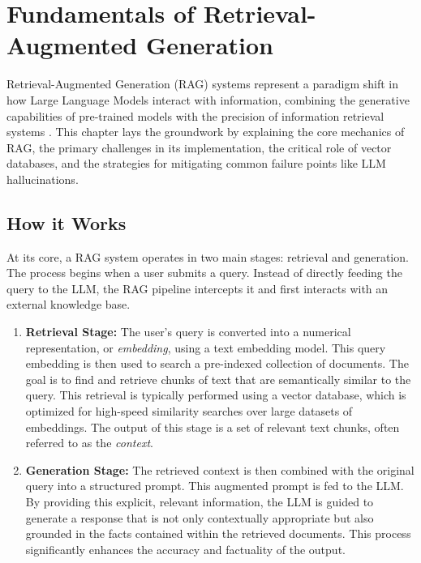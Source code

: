 \chapter{Fundamentals of Retrieval-Augmented Generation}
\label{chap:fundamentals_rag}

Retrieval-Augmented Generation (RAG) systems represent a paradigm shift in how Large Language Models interact with information, combining the generative capabilities of pre-trained models with the precision of information retrieval systems \autocite{rag_survey_2024_ralm}. This chapter lays the groundwork by explaining the core mechanics of RAG, the primary challenges in its implementation, the critical role of vector databases, and the strategies for mitigating common failure points like LLM hallucinations.

\section{How it Works}
At its core, a RAG system operates in two main stages: retrieval and generation. The process begins when a user submits a query. Instead of directly feeding the query to the LLM, the RAG pipeline intercepts it and first interacts with an external knowledge base.

\begin{enumerate}
    \item \textbf{Retrieval Stage:} The user's query is converted into a numerical representation, or \textit{embedding}, using a text embedding model. This query embedding is then used to search a pre-indexed collection of documents. The goal is to find and retrieve chunks of text that are semantically similar to the query. This retrieval is typically performed using a vector database, which is optimized for high-speed similarity searches over large datasets of embeddings. The output of this stage is a set of relevant text chunks, often referred to as the \textit{context}.
    
    \item \textbf{Generation Stage:} The retrieved context is then combined with the original query into a structured prompt. This augmented prompt is fed to the LLM. By providing this explicit, relevant information, the LLM is guided to generate a response that is not only contextually appropriate but also grounded in the facts contained within the retrieved documents. This process significantly enhances the accuracy and factuality of the output.
\end{enumerate}

